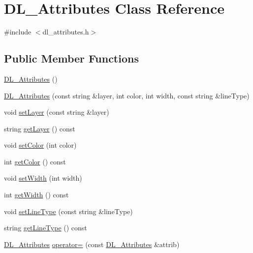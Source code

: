 \hypertarget{classDL__Attributes}{\section{D\-L\-\_\-\-Attributes Class Reference}
\label{classDL__Attributes}
}


{\ttfamily \#include $<$dl\-\_\-attributes.\-h$>$}

\subsection*{Public Member Functions}
\begin{DoxyCompactItemize}
\item 
\hyperlink{classDL__Attributes_a55d9d4bc7d736b129692399d8b91ceaf}{D\-L\-\_\-\-Attributes} ()
\item 
\hyperlink{classDL__Attributes_a4fca7e096f467d900ab996b84edb7b68}{D\-L\-\_\-\-Attributes} (const string \&layer, int color, int width, const string \&line\-Type)
\item 
void \hyperlink{classDL__Attributes_a1fab57d381143857a2cf5b6b30c023a4}{set\-Layer} (const string \&layer)
\item 
string \hyperlink{classDL__Attributes_a43aa4d633eccc8513ec1a75661ea66f8}{get\-Layer} () const 
\item 
void \hyperlink{classDL__Attributes_aef3dc67d8b5695bac13dc2534c18c33b}{set\-Color} (int color)
\item 
int \hyperlink{classDL__Attributes_ae63755d1a24585eb32e6181cf1ce1031}{get\-Color} () const 
\item 
void \hyperlink{classDL__Attributes_adabd8731639a35915b6a79528d220535}{set\-Width} (int width)
\item 
int \hyperlink{classDL__Attributes_abdf2b49a5529f4c8c481bb47c8a7e368}{get\-Width} () const 
\item 
void \hyperlink{classDL__Attributes_a0b4f31805ec40b27df4ea2c0a1d74a7d}{set\-Line\-Type} (const string \&line\-Type)
\item 
string \hyperlink{classDL__Attributes_a70fbec6193f17ce3dcc65873d92d76ca}{get\-Line\-Type} () const 
\item 
\hyperlink{classDL__Attributes}{D\-L\-\_\-\-Attributes} \hyperlink{classDL__Attributes_ac2b8dc39c0a8613a8b55cdafd44586c7}{operator=} (const \hyperlink{classDL__Attributes}{D\-L\-\_\-\-Attributes} \&attrib)
\end{DoxyCompactItemize}


